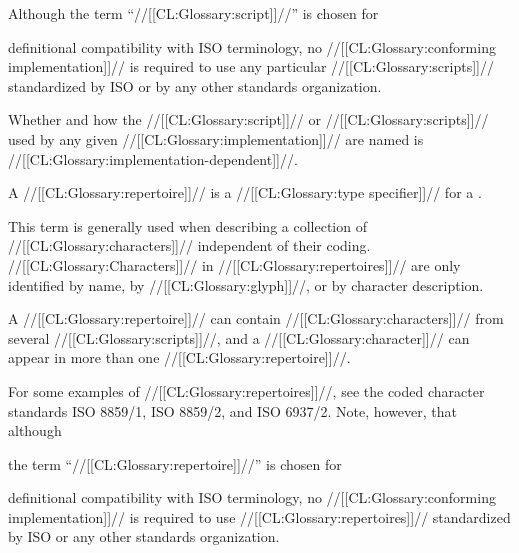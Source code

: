 


Although
the term ``//[[CL:Glossary:script]]//'' is chosen for 

definitional 
compatibility with ISO terminology, no //[[CL:Glossary:conforming implementation]]// 
is required to use any particular //[[CL:Glossary:scripts]]// standardized by ISO
or by any other standards organization.


Whether and how the //[[CL:Glossary:script]]// or //[[CL:Glossary:scripts]]// used by any given
//[[CL:Glossary:implementation]]// are named is //[[CL:Glossary:implementation-dependent]]//.


\endsubsubsection%


A //[[CL:Glossary:repertoire]]// is a //[[CL:Glossary:type specifier]]// for a .

This term is generally used when describing a collection of //[[CL:Glossary:characters]]//
independent of their coding.
//[[CL:Glossary:Characters]]// in //[[CL:Glossary:repertoires]]// are only identified
    by name,
    by //[[CL:Glossary:glyph]]//, or
    by character description.

A //[[CL:Glossary:repertoire]]// can contain //[[CL:Glossary:characters]]// from several
//[[CL:Glossary:scripts]]//, and a //[[CL:Glossary:character]]// can appear in more than
one //[[CL:Glossary:repertoire]]//.

For some examples of //[[CL:Glossary:repertoires]]//, see the coded character standards
ISO 8859/1, ISO 8859/2, and ISO 6937/2.
Note, however, that although

the term ``//[[CL:Glossary:repertoire]]//'' is chosen for 

definitional 
compatibility with ISO terminology, no //[[CL:Glossary:conforming implementation]]// 
is required to use //[[CL:Glossary:repertoires]]// standardized by ISO or any other 
standards organization.


\endsubsubsection%

\endsubSection%



